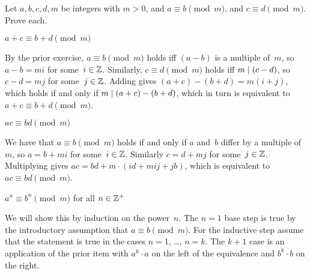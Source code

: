 \documentclass{test}  %
\begin{document}
\begin{problem}
Let $a,b,c,d,m$ be integers with $m>0$, and
$a\equiv b\pmod m$, and $c\equiv d\pmod m$.
Prove each.
\begin{exes}
\begin{exercise}
  $a+c\equiv b+d\pmod m$
\end{exercise}
\begin{answer}
  By the prior exercise, $a\equiv b\pmod m$ holds iff 
  $(a-b)$ is a multiple of~$m$, 
  so $a-b=mi$ for some~$i\in\mathbb{Z}$.
  Similarly, $c\equiv d\pmod m$ holds iff $m\mid (c-d)$, 
  so $c-d=mj$ for some~$j\in\mathbb{Z}$.
  Adding gives $(a+c)-(b+d)=m(i+j)$, which holds if and only if
  $m\mid (a+c)-(b+d)$, which in turn is equivalent to
  $a+c\equiv b+d\pmod m$.
\end{answer}
\begin{exercise} 
  $ac\equiv bd\pmod m$
\end{exercise}
\begin{answer}
  We have that $a\equiv b\pmod m$ holds if and only if
  $a$ and~$b$ differ by a multiple of~$m$, so 
  $a=b+mi$ for some~$i\in\mathbb{Z}$. 
  Similarly $c=d+mj$ for some~$j\in\mathbb{Z}$.
  Multiplying gives $ac=bd+m\cdot(id+mij+jb)$, 
  which is equivalent to $ac\equiv bd\pmod m$.   
\end{answer}
\begin{exercise} 
  $a^n\equiv b^n\pmod m$ for all $n\in\mathbb{Z}^+$
\end{exercise}
\begin{answer}
  We will show this by induction on the power~$n$.
  The $n=1$ base step is true by the introductory assumption that 
  $a\equiv b\pmod m$.
  For the inductive step assume that the statement is true in the cases
  $n=1$, \ldots, $n=k$.
  The $k+1$ case is an application of the prior item with 
  $a^k\cdot a$ on the left of the equivalence and $b^k\cdot b$ on the
  right.  
\end{answer}
\end{exes}

\end{problem}
\end{document}
